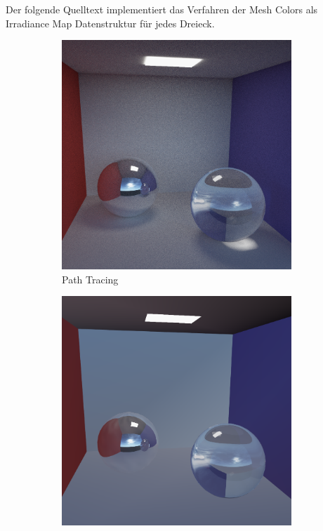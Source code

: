 	Der folgende Quelltext implementiert das Verfahren der Mesh Colors als Irradiance Map Datenstruktur für jedes Dreieck.
	

	

	\begin{figure}[h]
		\begin{subfigure}[b]{0.33\textwidth}
			\center
			\includegraphics[width=0.95\textwidth]{pic/irrmap-cornell-ref.png}
			\caption{Path Tracing}
		\end{subfigure}
		\begin{subfigure}[b]{0.33\textwidth}
			\center
			\includegraphics[width=0.95\textwidth]{pic/irrmap-cornell-vmap.png}

\end{subfigure}
\end{figure}
